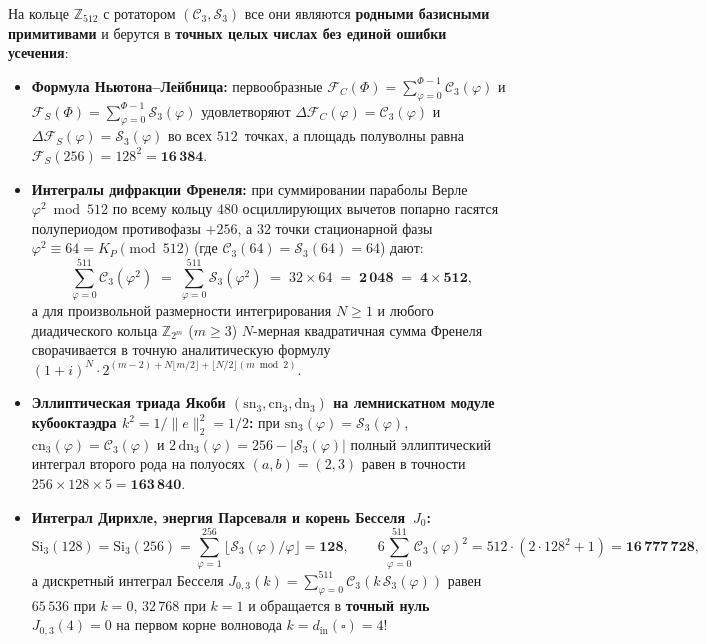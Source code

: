 На кольце $\mathbb{Z}_{512}$ с ротатором $(\mathcal{C}_3,\mathcal{S}_3)$ все они являются \textbf{родными базисными примитивами} и берутся в \textbf{точных целых числах без единой ошибки усечения}:
\begin{itemize}[noitemsep,leftmargin=*]
\item \textbf{Формула Ньютона--Лейбница:} первообразные $\mathcal{F}_C(\Phi)=\sum_{\varphi=0}^{\Phi-1}\mathcal{C}_3(\varphi)$ и $\mathcal{F}_S(\Phi)=\sum_{\varphi=0}^{\Phi-1}\mathcal{S}_3(\varphi)$ удовлетворяют $\Delta\mathcal{F}_C(\varphi)=\mathcal{C}_3(\varphi)$ и $\Delta\mathcal{F}_S(\varphi)=\mathcal{S}_3(\varphi)$ во всех $512$~точках, а площадь полуволны равна $\mathcal{F}_S(256) = 128^2 = \mathbf{16\,384}$.
\item \textbf{Интегралы дифракции Френеля:} при суммировании параболы Верле $\varphi^2\bmod 512$ по всему кольцу $480$ осциллирующих вычетов попарно гасятся полупериодом противофазы $+256$, а $32$ точки стационарной фазы $\varphi^2\equiv 64 = K_P\pmod{512}$ (где $\mathcal{C}_3(64)=\mathcal{S}_3(64)=64$) дают:
  \[
    \sum_{\varphi=0}^{511} \mathcal{C}_3(\varphi^2)
    \;=\; \sum_{\varphi=0}^{511} \mathcal{S}_3(\varphi^2)
    \;=\; 32 \times 64 \;=\; \mathbf{2\,048 \;=\; 4 \times 512},
  \]
  а для произвольной размерности интегрирования $N \ge 1$ и любого диадического кольца $\mathbb{Z}_{2^m}$ ($m \ge 3$) $N$-мерная квадратичная сумма Френеля сворачивается в точную аналитическую формулу $(1 + i)^N\cdot 2^{(m-2) + N\lfloor m/2\rfloor + \lfloor N/2\rfloor(m\bmod 2)}$.
\item \textbf{Эллиптическая триада Якоби $(\mathrm{sn}_3,\mathrm{cn}_3,\mathrm{dn}_3)$ на лемнискатном модуле кубооктаэдра $k^2 = 1/\|e\|_2^2 = 1/2$:}
  при $\mathrm{sn}_3(\varphi)=\mathcal{S}_3(\varphi)$, $\mathrm{cn}_3(\varphi)=\mathcal{C}_3(\varphi)$ и $2\,\mathrm{dn}_3(\varphi) = 256 - |\mathcal{S}_3(\varphi)|$ полный эллиптический интеграл второго рода на полуосях $(a,b)=(2,3)$ равен в точности $256\times 128\times 5 = \mathbf{163\,840}$.
\item \textbf{Интеграл Дирихле, энергия Парсеваля и корень Бесселя~$J_0$:}
  \[
    \mathrm{Si}_3(128) = \mathrm{Si}_3(256) = \sum_{\varphi=1}^{256}\bigl\lfloor\mathcal{S}_3(\varphi)/\varphi\bigr\rfloor = \mathbf{128},
    \qquad
    6\sum_{\varphi=0}^{511}\mathcal{C}_3(\varphi)^2 = 512\cdot(2\cdot 128^2 + 1) = \mathbf{16\,777\,728},
  \]
  а дискретный интеграл Бесселя $J_{0,3}(k) = \sum_{\varphi=0}^{511}\mathcal{C}_3(k\,\mathcal{S}_3(\varphi))$ равен $65\,536$ при $k=0$, $32\,768$ при $k=1$ и обращается в \textbf{точный нуль $J_{0,3}(4) = 0$} на первом корне волновода $k = d_{\mathrm{in}}(\square) = 4$!

\end{itemize}
